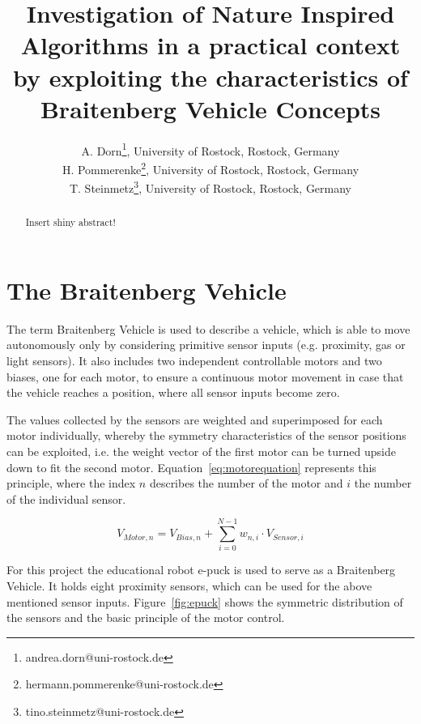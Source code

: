 \documentclass[a4paper]{jacow}
\begin{document}
\title{Investigation of Nature Inspired Algorithms in a practical context by exploiting the characteristics of Braitenberg Vehicle Concepts}

\author{A. Dorn\thanks{andrea.dorn@uni-rostock.de}, University of Rostock, Rostock, Germany \\
		H. Pommerenke\thanks{hermann.pommerenke@uni-rostock.de}, University of Rostock, Rostock, Germany \\
		T. Steinmetz\thanks{tino.steinmetz@uni-rostock.de}, University of Rostock, Rostock, Germany}
	
\maketitle


\begin{abstract}
   Insert shiny abstract!
\end{abstract}

\section{The Braitenberg Vehicle}
The term Braitenberg Vehicle is used to describe a vehicle, which is able to move autonomously only by considering primitive sensor inputs (e.g. proximity, gas or light sensors). It also includes two independent controllable motors and two biases, one for each motor, to ensure a continuous motor movement in case that the vehicle reaches a position, where all sensor inputs become zero.

The values collected by the sensors are weighted and superimposed for each motor individually, whereby the symmetry characteristics of the sensor positions can be exploited, i.e. the weight vector of the first motor can be turned upside down to fit the second motor. Equation~\ref{eq:motorequation} represents this principle, where the index $n$ describes the number of the motor and $i$ the number of the individual sensor.

\begin{equation}
	V_{Motor,n} = V_{Bias,n} + \sum\limits_{i=0}^{N-1}w_{n,i}\cdot V_{Sensor,i}
	\label{eq:motorequation}
\end{equation}

For this project the educational robot e-puck is used to serve as a Braitenberg Vehicle. It holds eight proximity sensors, which can be used for the above mentioned sensor inputs. Figure~\ref{fig:epuck} shows the symmetric distribution of the sensors and the basic principle of the motor control.
\end{document}
